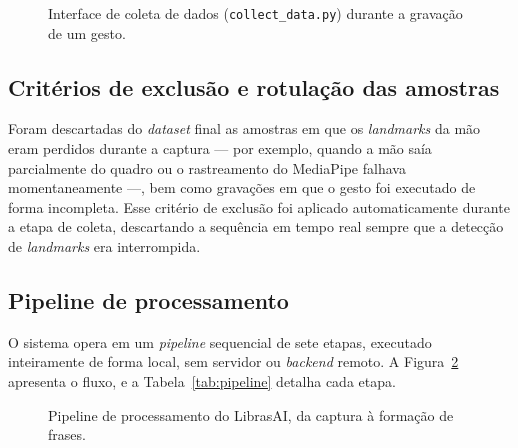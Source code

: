 \begin{figure}[htbp]
\centering
{}
\caption{Interface de coleta de dados (\texttt{collect\_data.py}) durante a
gravação de um gesto.}
\label{fig:coleta}
\end{figure}

\subsection{Critérios de exclusão e rotulação das amostras}

Foram descartadas do \textit{dataset} final as amostras em que os
\textit{landmarks} da mão eram perdidos durante a captura — por exemplo, quando a
mão saía parcialmente do quadro ou o rastreamento do MediaPipe falhava
momentaneamente —, bem como gravações em que o gesto foi executado de forma
incompleta. Esse critério de exclusão foi aplicado automaticamente durante a
etapa de coleta, descartando a sequência em tempo real sempre que a detecção de
\textit{landmarks} era interrompida.


\subsection{Pipeline de processamento}
\label{subsec:pipeline}

O sistema opera em um \textit{pipeline} sequencial de sete etapas, executado
inteiramente de forma local, sem servidor ou \textit{backend} remoto. A
Figura~\ref{fig:pipeline} apresenta o fluxo, e a Tabela~\ref{tab:pipeline}
detalha cada etapa.

\begin{figure}[htbp]
\centering
{}
\caption{Pipeline de processamento do LibrasAI, da captura à formação de frases.}
\label{fig:pipeline}
\end{figure}

